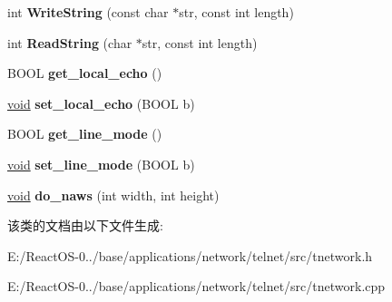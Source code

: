 \begin{DoxyCompactItemize}
\mbox{\label{class_t_network_a9cf7d2b13082edada6fef702630623e9}} 
int {\bfseries Write\+String} (const char $\ast$str, const int length)
\item 
\mbox{\label{class_t_network_a1e943a74db1310193258ccd5bb5cad42}} 
int {\bfseries Read\+String} (char $\ast$str, const int length)
\item 
\mbox{\label{class_t_network_aa7b0ea36b08be2b8461915c6dedc0c28}} 
B\+O\+OL {\bfseries get\+\_\+local\+\_\+echo} ()
\item 
\mbox{\label{class_t_network_a9b558b4074e6e1a07d94374647710f23}} 
\hyperlink{interfacevoid}{void} {\bfseries set\+\_\+local\+\_\+echo} (B\+O\+OL b)
\item 
\mbox{\label{class_t_network_a25d004d6b13802e1fb8cb83fd060ad05}} 
B\+O\+OL {\bfseries get\+\_\+line\+\_\+mode} ()
\item 
\mbox{\label{class_t_network_a4ef2f00fb4d3f55610773a009c5bb42e}} 
\hyperlink{interfacevoid}{void} {\bfseries set\+\_\+line\+\_\+mode} (B\+O\+OL b)
\item 
\mbox{\label{class_t_network_aaddf32c01a6317d032480b2d0895bec3}} 
\hyperlink{interfacevoid}{void} {\bfseries do\+\_\+naws} (int width, int height)
\end{DoxyCompactItemize}


该类的文档由以下文件生成\+:\begin{DoxyCompactItemize}
\item 
E\+:/\+React\+O\+S-\/0../base/applications/network/telnet/src/tnetwork.\+h\item 
E\+:/\+React\+O\+S-\/0../base/applications/network/telnet/src/tnetwork.\+cpp\end{DoxyCompactItemize}
